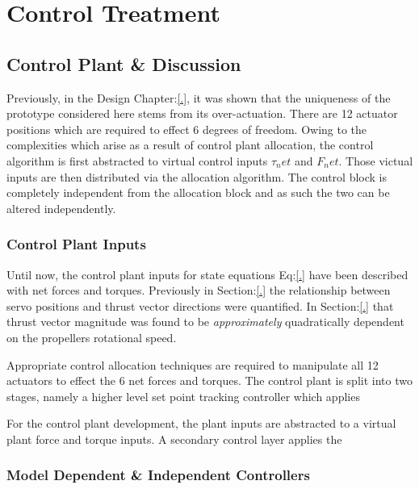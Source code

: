 \chapter{Control Treatment}
\label{ch:control}
\section*{Control Plant \& Discussion}
Previously, in the Design Chapter:\ref{.}, it was shown that the uniqueness of the prototype considered here stems from its over-actuation. There are 12 actuator positions which are required to effect 6 degrees of freedom. Owing to the complexities which arise as a result of control plant allocation, the control algorithm is first abstracted to virtual control inputs $\tau_net$ and $F_net$. Those victual inputs are then distributed via the allocation algorithm. The control block is completely independent from the allocation block and as such the two can be altered independently.
\subsection*{Control Plant Inputs}
Until now, the control plant inputs for state equations Eq:\ref{.} have been described with net forces and torques. Previously in Section:\ref{.} the relationship between servo positions and thrust vector directions were quantified. In Section:\ref{.} that thrust vector magnitude was found to be \emph{approximately} quadratically dependent on the propellers rotational speed. 
\par
Appropriate control allocation techniques are required to manipulate all 12 actuators to effect the 6 net forces and torques. The control plant is split into two stages, namely a higher level set point tracking controller which applies 

For the control plant development, the plant inputs are abstracted to a virtual plant force and torque inputs. A secondary control layer applies the 
\subsection*{Model Dependent \& Independent Controllers}

